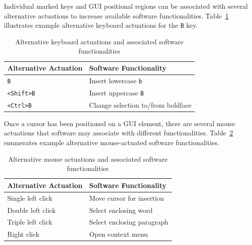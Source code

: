 Individual marked keys and GUI positional regions can be associated with
several alternative actuations to increase available software
functionalities. Table~\ref{tab:alt-keyboard-actuations} illustrates
example alternative keyboard actuations for the \texttt{B} key.

\begin{table}[H]
	\centering
	\caption{Alternative keyboard actuations and associated software functionalities}
	\label{tab:alt-keyboard-actuations}
	\begingroup
	\setlength{\tabcolsep}{4pt}%
	\renewcommand{\arraystretch}{0.9}%
	\begin{singlespace*}
		\small

		\begin{tabular}{|l|l|}
			\hline
			\textbf{Alternative Actuation} & \textbf{Software Functionality} \\ \hline
			\texttt{B}                     & Insert lowercase \texttt{b} \\ \hline
			\texttt{\textless Shift\textgreater B} & Insert uppercase \texttt{B} \\ \hline
			\texttt{\textless Ctrl\textgreater B}  & Change selection to/from boldface \\ \hline
		\end{tabular}

	\end{singlespace*}
	\endgroup
\end{table}

Once a cursor has been positioned on a GUI element, there are several
mouse actuations that software may associate with different
functionalities. Table~\ref{tab:alt-mouse-actuations} enumerates example
alternative mouse-actuated software functionalities.

\begin{table}[H]
	\centering
	\caption{Alternative mouse actuations and associated software functionalities}
	\label{tab:alt-mouse-actuations}

	\begingroup
	\setlength{\tabcolsep}{4pt}%
	\renewcommand{\arraystretch}{0.9}%
	\begin{singlespace*}
		\small

		\begin{tabular}{|l|l|}
			\hline
			\textbf{Alternative Actuation} & \textbf{Software Functionality} \\ \hline
			Single left click  & Move cursor for insertion \\ \hline
			Double left click  & Select enclosing word \\ \hline
			Triple left click  & Select enclosing paragraph \\ \hline
			Right click        & Open context menu \\ \hline
		\end{tabular}

	\end{singlespace*}
	\endgroup
\end{table}


